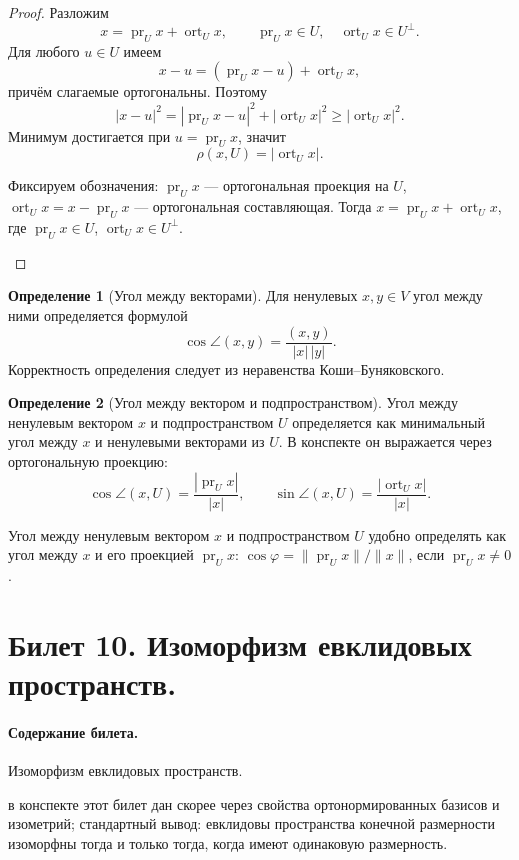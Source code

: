 \documentclass[12pt,a4paper]{article}
\theoremstyle{definition}
\newtheorem{definition}{Определение}[section]
\theoremstyle{plain}
\theoremstyle{remark}
\newenvironment{planadd}{\begin{planbox}}{\end{planbox}}
\newenvironment{knowledgefix}{\begin{clarifybox}}{\end{clarifybox}}
\newcommand{\pr}{\operatorname{pr}}
\newcommand{\ort}{\operatorname{ort}}
\begin{document}
\begin{proof}
Разложим
\[
    x=\pr_U x+\ort_U x,
    \qquad \pr_Ux\in U,
    \quad \ort_Ux\in U^\perp.
\]
Для любого $u\in U$ имеем
\[
    x-u=(\pr_Ux-u)+\ort_Ux,
\]
причём слагаемые ортогональны. Поэтому
\[
    |x-u|^2=|\pr_Ux-u|^2+|\ort_Ux|^2\ge |\ort_Ux|^2.
\]
Минимум достигается при $u=\pr_Ux$, значит
\[
    \rho(x,U)=|\ort_Ux|.
\]
\begin{knowledgefix}
Фиксируем обозначения: \(\pr_U x\) — ортогональная проекция на \(U\), \(\ort_U x=x-\pr_U x\) — ортогональная составляющая. Тогда \(x=\pr_U x+\ort_U x\), где \(\pr_U x\in U\), \(\ort_U x\in U^\perp\).
\end{knowledgefix}
\end{proof}

\begin{definition}[Угол между векторами]
Для ненулевых $x,y\in V$ угол между ними определяется формулой
\[
    \cos\angle(x,y)=\frac{(x,y)}{|x|\,|y|}.
\]
Корректность определения следует из неравенства Коши--Буняковского.
\end{definition}

\begin{definition}[Угол между вектором и подпространством]
Угол между ненулевым вектором $x$ и подпространством $U$ определяется как минимальный угол между $x$ и ненулевыми векторами из $U$.
В конспекте он выражается через ортогональную проекцию:
\[
    \cos\angle(x,U)=\frac{|\pr_Ux|}{|x|},
    \qquad
    \sin\angle(x,U)=\frac{|\ort_Ux|}{|x|}.
\]
\begin{knowledgefix}
Угол между ненулевым вектором \(x\) и подпространством \(U\) удобно определять как угол между \(x\) и его проекцией \(\pr_Ux\): \(\cos\varphi=\|\pr_Ux\|/\|x\|\), если \(\pr_Ux\ne0\).
\end{knowledgefix}
\end{definition}

\clearpage

\section{Билет 10. Изоморфизм евклидовых пространств.}

\paragraph{Содержание билета.} Изоморфизм евклидовых пространств.

\begin{planadd}

в конспекте этот билет дан скорее через свойства ортонормированных базисов и изометрий; стандартный вывод: евклидовы пространства конечной размерности изоморфны тогда и только тогда, когда имеют одинаковую размерность.

\end{planadd}
\end{document}
